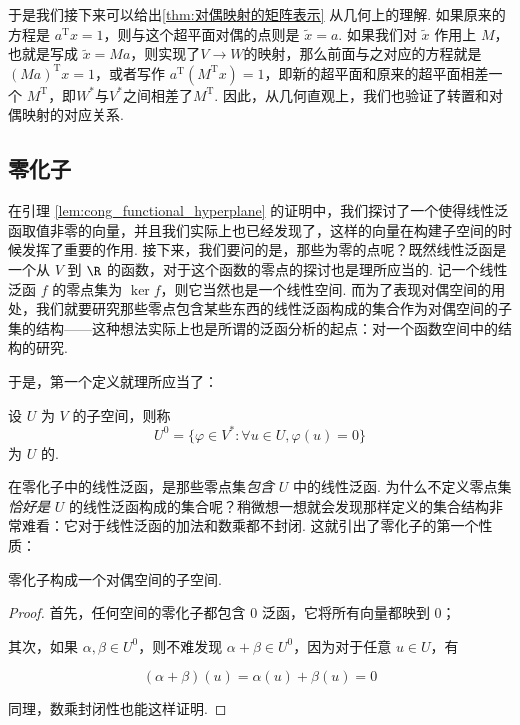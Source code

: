 于是我们接下来可以给出\autoref{thm:对偶映射的矩阵表示} 从几何上的理解. 如果原来的方程是 $a^\mathrm{T} x = 1$，则与这个超平面对偶的点则是 $\tilde{x} = a$. 如果我们对 $\tilde{x}$ 作用上 $M$，也就是写成 $\tilde{x} = Ma$，则实现了$V\to W$的映射，那么前面与之对应的方程就是 $(Ma)^\mathrm{T} x = 1$，或者写作 $a^\mathrm{T} (M^\mathrm{T} x) = 1$，即新的超平面和原来的超平面相差一个 $M^\mathrm{T}$，即$W^*$与$V^*$之间相差了$M^\mathrm{T}$. 因此，从几何直观上，我们也验证了转置和对偶映射的对应关系. %

\subsection{零化子}

在引理 \ref{lem:cong_functional_hyperplane} 的证明中，我们探讨了一个使得线性泛函取值非零的向量，并且我们实际上也已经发现了，这样的向量在构建子空间的时候发挥了重要的作用. 接下来，我们要问的是，那些为零的点呢？既然线性泛函是一个从 $V$ 到 $\R$ 的函数，对于这个函数的零点的探讨也是理所应当的. 记一个线性泛函 $f$ 的零点集为 $\ker f$，则它当然也是一个线性空间. 而为了表现对偶空间的用处，我们就要研究那些零点包含某些东西的线性泛函构成的集合作为对偶空间的子集的结构——这种想法实际上也是所谓的泛函分析的起点：对一个函数空间中的结构的研究.

于是，第一个定义就理所应当了：

\begin{definition}{}{}
    设 $U$ 为 $V$ 的子空间，则称
    \[
        U^0 = \{\varphi \in V^*: \forall u \in U, \varphi(u) = 0\}
    \]
    为 $U$ 的.
\end{definition}

在零化子中的线性泛函，是那些零点集\emph{包含} $U$ 中的线性泛函. 为什么不定义零点集\emph{恰好是} $U$ 的线性泛函构成的集合呢？稍微想一想就会发现那样定义的集合结构非常难看：它对于线性泛函的加法和数乘都不封闭. 这就引出了零化子的第一个性质：

\begin{theorem}{}{}
    零化子构成一个对偶空间的子空间.
\end{theorem}

\begin{proof}
    首先，任何空间的零化子都包含 $0$ 泛函，它将所有向量都映到 $0$；

    其次，如果 $\alpha, \beta \in U^0$，则不难发现 $\alpha + \beta \in U^0$，因为对于任意 $u \in U$，有

    \[
        (\alpha + \beta) (u) = \alpha (u) + \beta (u) = 0
    \]

    同理，数乘封闭性也能这样证明.
\end{proof}

